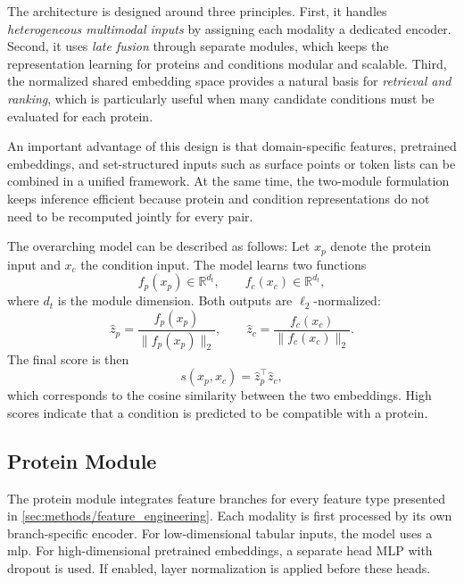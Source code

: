 The architecture is designed around three principles. First, it handles \emph{heterogeneous multimodal inputs} by assigning each modality a dedicated encoder. Second, it uses \emph{late fusion} through separate modules, which keeps the representation learning for proteins and conditions modular and scalable. Third, the normalized shared embedding space provides a natural basis for \emph{retrieval and ranking}, which is particularly useful when many candidate conditions must be evaluated for each protein.

An important advantage of this design is that domain-specific features, pretrained embeddings, and set-structured inputs such as surface points or token lists can be combined in a unified framework. At the same time, the two-module formulation keeps inference efficient because protein and condition representations do not need to be recomputed jointly for every pair.

The overarching model can be described as follows:
Let $x_p$ denote the protein input and $x_c$ the condition input. The model learns two functions
\begin{equation}
    f_p(x_p) \in \mathbb{R}^{d_t}, \qquad f_c(x_c) \in \mathbb{R}^{d_t},
\end{equation}
where $d_t$ is the module dimension. Both outputs are $\ell_2$-normalized:
\begin{equation}
    \hat{z}_p = \frac{f_p(x_p)}{\|f_p(x_p)\|_2}, \qquad
    \hat{z}_c = \frac{f_c(x_c)}{\|f_c(x_c)\|_2}.
\end{equation}
The final score is then
\begin{equation}
    s(x_p, x_c) = \hat{z}_p^\top \hat{z}_c,
\end{equation}
which corresponds to the cosine similarity between the two embeddings. High scores indicate that a condition is predicted to be compatible with a protein.

\subsection{Protein Module}

The protein module integrates feature branches for every feature type presented in \autoref{sec:methods/feature_engineering}.
Each modality is first processed by its own branch-specific encoder. For low-dimensional tabular inputs, the model uses a \gls{mlp}. For high-dimensional pretrained embeddings, a separate head MLP with dropout is used. If enabled, layer normalization is applied before these heads.

